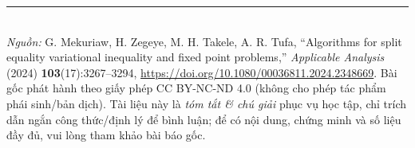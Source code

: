 \documentclass[11pt,a4paper]{article}
\theoremstyle{plain}
\theoremstyle{definition}
\begin{document}
\vfill
\noindent\rule{\linewidth}{0.4pt}\\[2pt]
{\footnotesize\textit{Nguồn:} G. Mekuriaw, H. Zegeye, M. H. Takele, A. R. Tufa, ``Algorithms for split equality variational inequality and fixed point problems,'' \textit{Applicable Analysis} (2024) \textbf{103}(17):3267--3294, \url{https://doi.org/10.1080/00036811.2024.2348669}. Bài gốc phát hành theo giấy phép CC BY-NC-ND 4.0 (không cho phép tác phẩm phái sinh/bản dịch). Tài liệu này là \emph{tóm tắt \& chú giải} phục vụ học tập, chỉ trích dẫn ngắn công thức/định lý để bình luận; để có nội dung, chứng minh và số liệu đầy đủ, vui lòng tham khảo bài báo gốc.}
\end{document}
